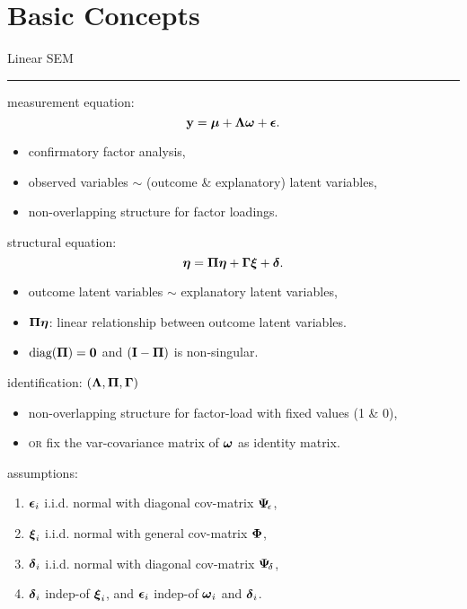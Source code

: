 
\section*{Basic Concepts}

\vspace{-1em}

Linear SEM \phantom{g} \hrule

measurement equation:
    \[\mathbf{y} = \boldsymbol{\mu} + \boldsymbol{\Lambda} \boldsymbol{\omega} + \boldsymbol{\epsilon}.\]
\begin{itemize}
    \item confirmatory factor analysis,
    \item observed variables $\sim$ (outcome \& explanatory) latent variables,
    \item non-overlapping structure for factor loadings.
\end{itemize}


structural equation: 
    \[\boldsymbol{\eta} = \boldsymbol{\Pi} \boldsymbol{\eta} + \boldsymbol{\Gamma} \boldsymbol{\xi} + \boldsymbol{\delta}.\]
\begin{itemize}
    \item outcome latent variables $\sim$ explanatory latent variables,
    \item $\boldsymbol{\Pi} \boldsymbol{\eta}$: linear relationship between outcome latent variables.
    \item $\text{diag}(\boldsymbol{\Pi}) = \mathbf{0}$ and $(\mathbf{I}{} - \boldsymbol{\Pi})$ is non-singular.
\end{itemize}

identification: $(\boldsymbol{\Lambda}, \boldsymbol{\Pi}, \boldsymbol{\Gamma})$ \begin{itemize}
    \item non-overlapping structure for factor-load  with fixed values (1 \& 0),
    \item \textsc{or} fix the var-covariance matrix of $\boldsymbol{\omega}$ as identity matrix.
\end{itemize}


assumptions: \begin{enumerate}
    \item $\boldsymbol{\epsilon}_i$ i.i.d. normal with diagonal cov-matrix $\boldsymbol{\Psi}_{\!\epsilon}$,
    \item $\boldsymbol{\xi}_i$ i.i.d. normal with general cov-matrix $\boldsymbol{\Phi}$,
    \item $\boldsymbol{\delta}_i$ i.i.d. normal with diagonal cov-matrix $\boldsymbol{\Psi}_{\!\delta}$,
    \item $\boldsymbol{\delta}_i$ indep-of $\boldsymbol{\xi}_i$, and $\boldsymbol{\epsilon}_i$ indep-of $\boldsymbol{\omega}_i$ and $\boldsymbol{\delta}_i$.
\end{enumerate}


